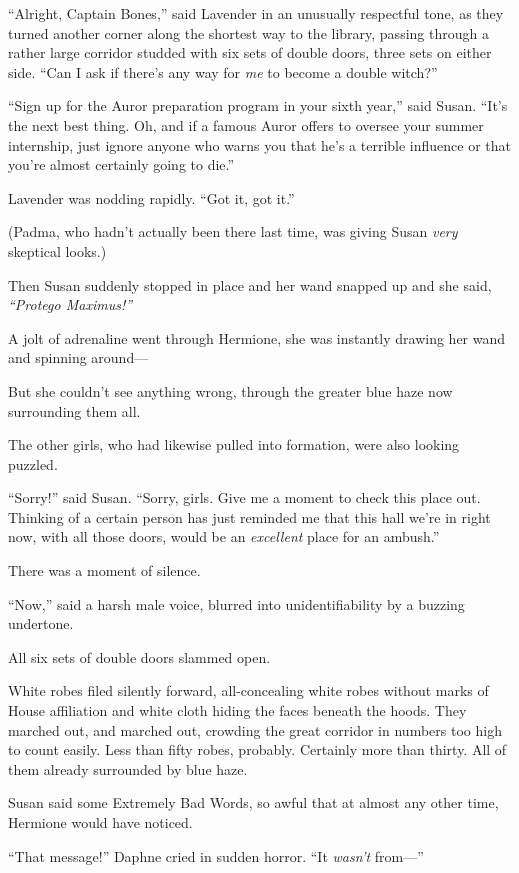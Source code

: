 ``Alright, Captain Bones,'' said Lavender in an unusually respectful
tone, as they turned another corner along the shortest way to the
library, passing through a rather large corridor studded with six sets
of double doors, three sets on either side. ``Can I ask if there's any
way for \emph{me} to become a double witch?''

``Sign up for the Auror preparation program in your sixth year,'' said
Susan. ``It's the next best thing. Oh, and if a famous Auror offers to
oversee your summer internship, just ignore anyone who warns you that
he's a terrible influence or that you're almost certainly going to
die.''

Lavender was nodding rapidly. ``Got it, got it.''

(Padma, who hadn't actually been there last time, was giving Susan
\emph{very} skeptical looks.)

Then Susan suddenly stopped in place and her wand snapped up and she
said, \emph{``Protego Maximus!''}

A jolt of adrenaline went through Hermione, she was instantly drawing
her wand and spinning around---

But she couldn't see anything wrong, through the greater blue haze now
surrounding them all.

The other girls, who had likewise pulled into formation, were also
looking puzzled.

``Sorry!'' said Susan. ``Sorry, girls. Give me a moment to check this
place out. Thinking of a certain person has just reminded me that this
hall we're in right now, with all those doors, would be an
\emph{excellent} place for an ambush.''

There was a moment of silence.

``Now,'' said a harsh male voice, blurred into unidentifiability by a
buzzing undertone.

All six sets of double doors slammed open.

White robes filed silently forward, all-concealing white robes without
marks of House affiliation and white cloth hiding the faces beneath the
hoods. They marched out, and marched out, crowding the great corridor in
numbers too high to count easily. Less than fifty robes, probably.
Certainly more than thirty. All of them already surrounded by blue haze.

Susan said some Extremely Bad Words, so awful that at almost any other
time, Hermione would have noticed.

``That message!'' Daphne cried in sudden horror. ``It \emph{wasn't}
from---''

